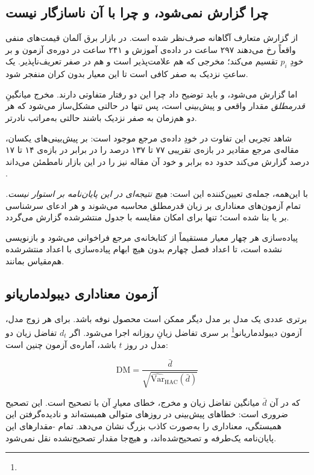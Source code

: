 \subsection*{چرا  گزارش نمی‌شود، و چرا  با آن ناسازگار نیست}

از گزارش  متعارف آگاهانه صرف‌نظر شده است. در بازار برق آلمان قیمت‌های منفی
واقعاً رخ می‌دهند  ۲۹۷ ساعت در داده‌ی آموزش و ۲۴۱ ساعت در دوره‌ی آزمون  و
 بر خودِ $p_i$ تقسیم می‌کند؛ مخرجی که هم علامت‌پذیر است و هم در صفر
تعریف‌ناپذیر. یک ساعتِ نزدیک به صفر کافی است تا این معیار بدون کران منفجر شود.

اما  گزارش می‌شود، و باید توضیح داد چرا این دو رفتار متفاوتی دارند. مخرج
 میانگینِ \emph{قدرمطلق} مقدار واقعی و پیش‌بینی است، پس تنها در حالتی
مشکل‌ساز می‌شود که هر دو هم‌زمان به صفر نزدیک باشند  حالتی به‌مراتب نادرتر.

شاهد تجربی این تفاوت در خودِ داده‌ی مرجع موجود است: بر پیش‌بینی‌های یکسان، مقاله‌ی مرجع
مقادیر  در بازه‌ی تقریبی ۷۷ تا ۱۳۷ درصد را در برابر  در بازه‌ی ۱۴ تا
۱۷ درصد گزارش می‌کند  حدود ده برابر  و خود آن مقاله نیز  را در
این بازار نامطمئن می‌داند \cite{lago_forecasting_2021}.

با این‌همه، جمله‌ی تعیین‌کننده این است: \emph{هیچ نتیجه‌ای در این پایان‌نامه بر
 استوار نیست.} تمام آزمون‌های معناداری بر زیان قدرمطلق محاسبه می‌شوند و هر
ادعای سرشناسی بر  یا  بنا شده است؛  تنها برای امکان
مقایسه با جدول منتشرشده گزارش می‌گردد.

پیاده‌سازی هر چهار معیار مستقیماً از کتابخانه‌ی مرجع فراخوانی می‌شود و بازنویسی نشده
است، تا اعداد فصل چهارم بدون هیچ ابهام پیاده‌سازی با اعداد منتشرشده هم‌مقیاس بمانند.

\subsection*{آزمون معناداری دیبولدماریانو}

برتری عددی یک مدل بر مدل دیگر ممکن است محصول نوفه باشد. برای هر زوج مدل، آزمون
دیبولدماریانو\footnote{} بر سری تفاضل زیانِ روزانه اجرا
می‌شود. اگر $d_t$ تفاضل زیان دو مدل در روز $t$ باشد، آماره‌ی آزمون چنین است:

\begin{equation}
\mathrm{DM} = \frac{\bar{d}}{\sqrt{\widehat{\mathrm{Var}}_{\mathrm{HAC}}(\bar{d})}}
\end{equation}

که در آن $\bar{d}$ میانگین تفاضل زیان و مخرج، خطای معیارِ آن با تصحیح
 است. این تصحیح ضروری است: خطاهای پیش‌بینی در روزهای متوالی همبسته‌اند و
نادیده‌گرفتن این همبستگی، معناداری را به‌صورت کاذب بزرگ نشان می‌دهد. تمام
-مقدارهای این پایان‌نامه یک‌طرفه و تصحیح‌شده‌اند، و هیچ‌جا مقدار تصحیح‌نشده نقل
نمی‌شود.


